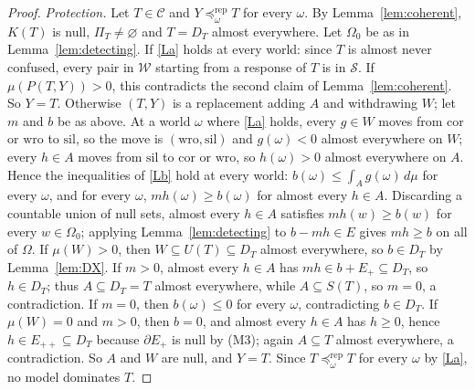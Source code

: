 \documentclass[11pt]{article}
\theoremstyle{definition}
\theoremstyle{remark}
\newcommand{\C}{\mathcal C}
\newcommand{\bd}{\partial}
\newcommand{\cor}{\mathrm{cor}}
\newcommand{\sil}{\mathrm{sil}}
\newcommand{\wro}{\mathrm{wro}}
\newcommand{\prep}{\preceq^{\mathrm{rep}}}
\begin{document}
\begin{proof}
\emph{Protection.} Let $T\in\C$ and $Y\prep_\omega T$ for every $\omega$. By Lemma~\ref{lem:coherent}, $K(T)$ is null, $\Pi_T\ne\varnothing$ and $T=D_T$ almost everywhere. Let $\Omega_0$ be as in Lemma~\ref{lem:detecting}.
If \ref{La} holds at every world: since $T$ is almost never confused, every pair in $\mathcal W$ starting from a response of $T$ is in $\mathcal S$. If $\mu(P(T,Y))>0$, this contradicts the second claim of Lemma~\ref{lem:coherent}. So $Y=T$.
Otherwise $(T,Y)$ is a replacement adding $A$ and withdrawing $W$; let $m$ and $b$ be as above. At a world $\omega$ where \ref{La} holds, every $g\in W$ moves from $\cor$ or $\wro$ to $\sil$, so the move is $(\wro,\sil)$ and $g(\omega)<0$ almost everywhere on $W$; every $h\in A$ moves from $\sil$ to $\cor$ or $\wro$, so $h(\omega)>0$ almost everywhere on $A$. Hence the inequalities of \ref{Lb} hold at every world: $b(\omega)\le\int_Ag(\omega)\,d\mu$ for every $\omega$, and for every $\omega$, $mh(\omega)\ge b(\omega)$ for almost every $h\in A$. Discarding a countable union of null sets, almost every $h\in A$ satisfies $mh(w)\ge b(w)$ for every $w\in\Omega_0$; applying Lemma~\ref{lem:detecting} to $b-mh\in E$ gives $mh\ge b$ on all of $\Omega$.
If $\mu(W)>0$, then $W\subseteq U(T)\subseteq D_T$ almost everywhere, so $b\in D_T$ by Lemma~\ref{lem:DX}. If $m>0$, almost every $h\in A$ has $mh\in b+E_+\subseteq D_T$, so $h\in D_T$; thus $A\subseteq D_T=T$ almost everywhere, while $A\subseteq S(T)$, so $m=0$, a contradiction. If $m=0$, then $b(\omega)\le0$ for every $\omega$, contradicting $b\in D_T$.
If $\mu(W)=0$ and $m>0$, then $b=0$, and almost every $h\in A$ has $h\ge0$, hence $h\in E_{++}\subseteq D_T$ because $\bd E_+$ is null by (M3); again $A\subseteq T$ almost everywhere, a contradiction.
So $A$ and $W$ are null, and $Y=T$. Since $T\prep_\omega T$ for every $\omega$ by \ref{La}, no model dominates $T$.
\end{proof}
\end{document}
